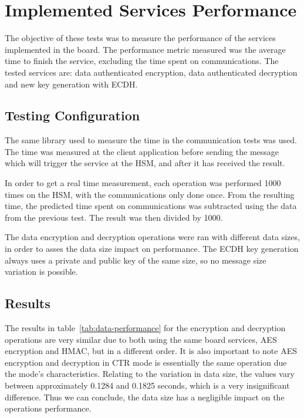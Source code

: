 \section{Implemented Services Performance}\label{chap:evaluation:services}

The objective of these tests was to measure the performance of the services implemented in the board.
The performance metric measured was the average time to finish the service, excluding the time spent on communications.
The tested services are: data authenticated encryption, data authenticated decryption and new key generation with \ac{ECDH}.

\subsection{Testing Configuration}\label{chap:evaluation:services:config}

The same library used to measure the time in the communication tests was used.
The time was measured at the client application before sending the message which will trigger the service at the HSM, and after it has received the result.

In order to get a real time measurement, each operation was performed 1000 times on the HSM, with the communications only done once.
From the resulting time, the predicted time spent on communications was subtracted using the data from the previous test. The result was then divided by 1000.

The data encryption and decryption operations were ran with different data sizes, in order to asses the data size impact on performance.
The ECDH key generation always uses a private and public key of the same size, so no message size variation is possible.

\subsection{Results}\label{chap:evaluation:services:results}



The results in table~\ref{tab:data-performance} for the encryption and decryption operations are very similar due to both using the same board services, AES encryption and HMAC, but in a different order. It is also important to note AES encryption and decryption in CTR mode is essentially the same operation due the mode's characteristics.
Relating to the variation in data size, the values vary between approximately 0.1284 and 0.1825 seconds, which is a very insignificant difference. Thus we can conclude, the data size has a negligible impact on the operations performance.

